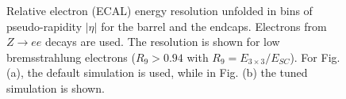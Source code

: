 \documentclass[journal]{IEEEtran}
\begin{document}
%
\begin{figure}[!t]
  \begin{center}
    \caption{Relative electron (ECAL) energy resolution unfolded in bins of pseudo-rapidity $\vert\eta\vert$ for the barrel and the endcaps. Electrons from $Z\to ee$ decays are used. The resolution is shown for low bremsstrahlung electrons ($R_9>0.94$ with $R_9 = E_{3 \times 3} / E_{SC}$). For Fig. (a), the default simulation is used, while in Fig. (b) the tuned simulation is shown. ~\label{energy_resol}}
  \end{center}
\end{figure}
%
\end{document}
